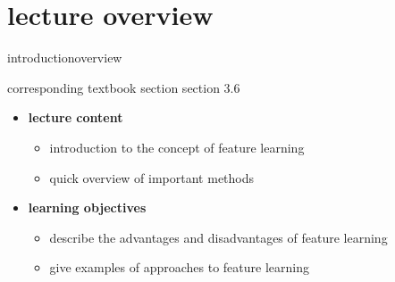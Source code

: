 

\subtitle{Module 3.6: Learned Features}


	

    \section[overview]{lecture overview}
        \begin{frame}{introduction}{overview}
            \begin{block}{corresponding textbook section}
                    section 3.6
            \end{block}

            \begin{itemize}
                \item   \textbf{lecture content}
                    \begin{itemize}
                        \item   introduction to the concept of  feature learning
                        \item   quick overview of important methods
                   \end{itemize}
                \bigskip
                \item<2->   \textbf{learning objectives}
                    \begin{itemize}
                        \item   describe the advantages and disadvantages of feature learning
                        \item   give examples of approaches to feature learning
                    \end{itemize}
            \end{itemize}
        \end{frame}

